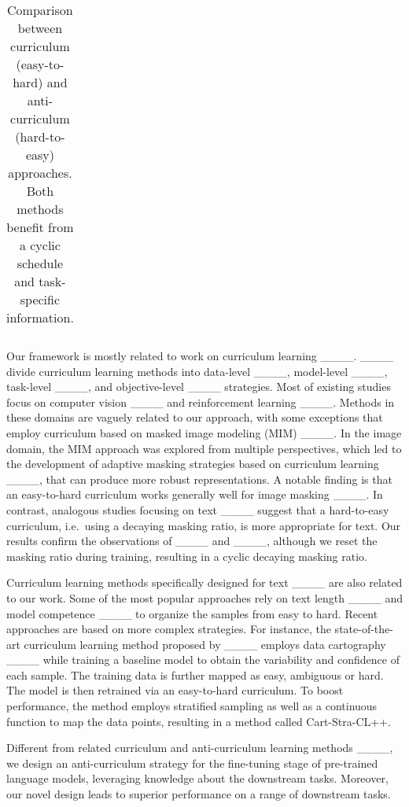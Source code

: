 \begin{table*}[t]
{\begin{tabular}{|c|c|c|c|c|c|c|}
    \hline
  \end{tabular}
  }
  \caption{\label{curriulum_vs_anticurriculum} Comparison between curriculum (easy-to-hard) and anti-curriculum (hard-to-easy) approaches. Both methods benefit from a cyclic schedule and task-specific information.}
\end{table*}
Our framework is mostly related to work on curriculum learning ____. ____ divide curriculum learning methods into data-level ____, model-level ____, task-level ____, and objective-level ____ strategies. Most of existing studies focus on computer vision ____ and reinforcement learning ____. Methods in these domains are vaguely related to our approach, with some exceptions that employ curriculum based on masked image modeling (MIM) ____. In the image domain, the MIM approach was explored from multiple perspectives, which led to the development of adaptive masking strategies based on curriculum learning ____, that can produce more robust representations. A notable finding is that an easy-to-hard curriculum works generally well for image masking ____. In contrast, analogous studies focusing on text ____ suggest that a hard-to-easy curriculum, i.e.~using a decaying masking ratio, is more appropriate for text. Our results confirm the observations of ____ and ____, although we reset the masking ratio during training, resulting in a cyclic decaying masking ratio.

Curriculum learning methods specifically designed for text ____ are also related to our work. Some of the most popular approaches rely on text length ____ and model competence ____ to organize the samples from easy to hard. Recent approaches are based on more complex strategies. For instance, the state-of-the-art curriculum learning method proposed by ____ employs data cartography ____ while training a baseline model to obtain the variability and confidence of each sample. The training data is further mapped as easy, ambiguous or hard. The model is then retrained via an easy-to-hard curriculum. To boost performance, the method employs stratified sampling as well as a continuous function to map the data points, resulting in a method called Cart-Stra-CL++.

Different from related curriculum and anti-curriculum learning methods ____, we design an anti-curriculum strategy for the fine-tuning stage of pre-trained language models, leveraging knowledge about the downstream tasks. Moreover, our novel design leads to superior performance on a range of downstream tasks.
%